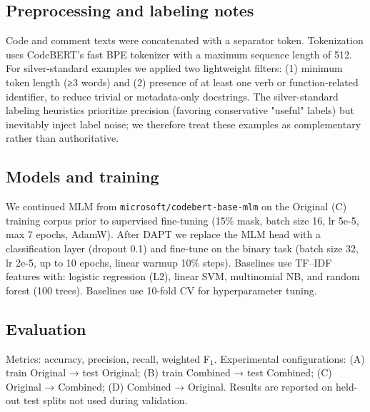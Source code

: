 \documentclass[runningheads]{ceurart}
\begin{document}
\subsection{Preprocessing and labeling notes}
Code and comment texts were concatenated with a separator token. Tokenization uses CodeBERT's fast BPE tokenizer with a maximum sequence length of 512. For silver-standard examples we applied two lightweight filters: (1) minimum token length (≥3 words) and (2) presence of at least one verb or function-related identifier, to reduce trivial or metadata-only docstrings. The silver-standard labeling heuristics prioritize precision (favoring conservative "useful" labels) but inevitably inject label noise; we therefore treat these examples as complementary rather than authoritative.

\subsection{Models and training}
We continued MLM from \texttt{microsoft/codebert-base-mlm} on the Original (C) training corpus prior to supervised fine-tuning (15\% mask, batch size 16, lr 5e-5, max 7 epochs, AdamW). After DAPT we replace the MLM head with a classification layer (dropout 0.1) and fine-tune on the binary task (batch size 32, lr 2e-5, up to 10 epochs, linear warmup 10\% steps). Baselines use TF--IDF features with: logistic regression (L2), linear SVM, multinomial NB, and random forest (100 trees). Baselines use 10-fold CV for hyperparameter tuning.

\subsection{Evaluation}
Metrics: accuracy, precision, recall, weighted F$_1$. Experimental configurations: (A) train Original → test Original; (B) train Combined → test Combined; (C) Original → Combined; (D) Combined → Original. Results are reported on held-out test splits not used during validation.
\end{document}
